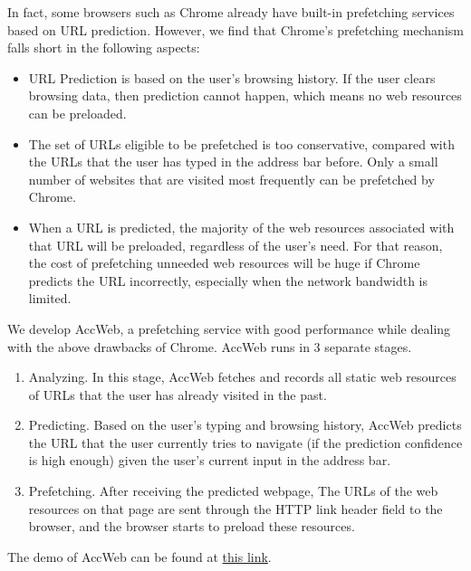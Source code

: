 In fact, some browsers such as Chrome already have built-in prefetching services based on URL prediction. However, we find that Chrome's prefetching mechanism falls short in the following aspects:
\begin{itemize}
	\item URL Prediction is based on the user's browsing history. If the user clears browsing data, then prediction cannot happen, which means no web resources can be preloaded.
	\item The set of URLs eligible to be prefetched is too conservative, compared with the URLs that the user has typed in the address bar before. Only a small number of websites that are visited most frequently can be prefetched by Chrome.
	\item When a URL is predicted, the majority of the web resources associated with that URL will be preloaded, regardless of the user's need. For that reason, the cost of prefetching unneeded web resources will be huge if Chrome predicts the URL incorrectly, especially when the network bandwidth is limited.
\end{itemize}

We develop AccWeb, a prefetching service with good performance while dealing with the above drawbacks of Chrome. AccWeb runs in 3 separate stages.
\begin{enumerate}
	\item Analyzing. In this stage, AccWeb fetches and records all static web resources of URLs that the user has already visited in the past.
	\item Predicting. Based on the user's typing and browsing history, AccWeb predicts the URL that the user currently tries to navigate (if the prediction confidence is high enough) given the user's current input in the address bar.
	\item Prefetching. After receiving the predicted webpage, The URLs of the web resources on that page are sent through the HTTP link header field to the browser, and the browser starts to preload these resources.
\end{enumerate}
The demo of AccWeb can be found at \href{https://github.com/caiqizhe/COS561_final_project}{this link}.

